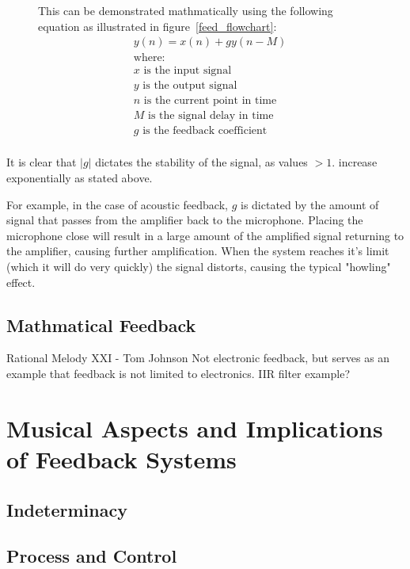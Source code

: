 \documentclass[titlepage]{scrartcl}
\begin{document}
    \begin{figure}[H]
    This can be demonstrated mathmatically using the following equation as
    illustrated in figure~\ref{feed_flowchart}:
        \begin{align*}
            & y(n) = x(n) + gy(n-M)\\
            & \text{where:}\\
            & x\text{ is the input signal}\\
            & y\text{ is the output signal}\\
            & n\text{ is the current point in time}\\
            & M\text{ is the signal delay in time}\\
            & g\text{ is the feedback coefficient}\\
        \end{align*}
    \end{figure}
    It is clear that $|g|$ dictates the stability of the signal, as values
    $>1.$ increase exponentially as stated above.~\parencite[p.70-72]{zolzer2011dafx} 

    For example, in the case of acoustic feedback, $g$ is dictated by the
    amount of signal that passes from the amplifier back to the microphone.
    Placing the microphone close will result in a large amount of the amplified
    signal returning to the amplifier, causing further amplification. When the
    system reaches it's limit (which it will do very quickly) the signal
    distorts, causing the typical "howling" effect.

    \subsection{Mathmatical Feedback}
    Rational Melody XXI - Tom Johnson
    Not electronic feedback, but serves as an example that feedback is not
    limited to electronics.
    IIR filter example?

    \section{Musical Aspects and Implications of Feedback Systems}
    \subsection{Indeterminacy}
    \subsection{Process and Control}
\end{document}
